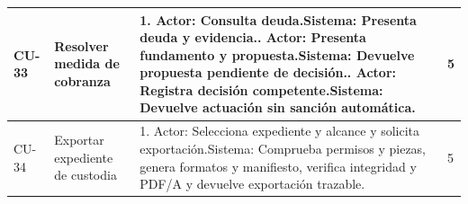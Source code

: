 \begin{longtable}{L{14mm}L{27mm}L{97mm}R{9mm}}
CU-33 & Resolver medida de cobranza & 1. Actor: Consulta deuda.\newline Sistema: Presenta deuda y evidencia.. Actor: Presenta fundamento y propuesta.\newline Sistema: Devuelve propuesta pendiente de decisión.. Actor: Registra decisión competente.\newline Sistema: Devuelve actuación sin sanción automática. & 5\\\hline
CU-34 & Exportar expediente de custodia & 1. Actor: Selecciona expediente y alcance y solicita exportación.\newline Sistema: Comprueba permisos y piezas, genera formatos y manifiesto, verifica integridad y PDF/A y devuelve exportación trazable. & 5\\\hline
\end{longtable}\endgroup
